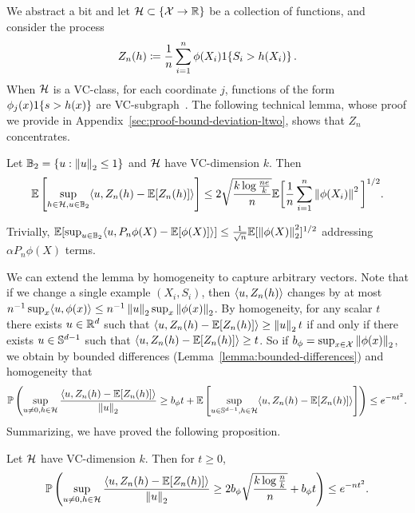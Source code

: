 \documentclass{article}
\newcommand{\radphi}{b_{\phi}}
\newcommand{\scorefunc}{s}
\newcommand{\scoreval}{\scorefunc}
\newcommand{\scorerv}{S}
\begin{document}
We abstract a bit and let $\mathcal{H} \subset \{\mathcal{X} \to \mathbb{R}\}$ be
a collection of functions, and consider the process
\begin{equation*}
  Z_n(h) \defeq \frac{1}{n}
  \sum_{i = 1}^n \phi(X_i) \indic{\scorerv_i > h(X_i)}.
\end{equation*}
%
When $\mathcal{H}$ is a VC-class, for each coordinate $j$, functions of the form
$\phi_j(x) \indic{\scoreval > h(x)}$ are VC-subgraph~\cite[Lemma
  2.6.18]{VanDerVaartWe96}.
%
The following technical lemma, whose proof we provide in
Appendix~\ref{sec:proof-bound-deviation-ltwo}, shows that $Z_n$
concentrates.
\begin{lemma}
  \label{lemma:bound-deviation-ltwo}
  Let $\mathbb{B}_2 = \{u : \left\|{u}\right\|_2 \le 1\}$
  and $\mathcal{H}$ have VC-dimension $k$.
  Then
  \begin{equation*}
    \mathbb{E}\left[\sup_{h \in \mathcal{H}, u \in \mathbb{B}_2}
      \langle u, Z_n(h) - \mathbb{E}[Z_n(h)]\rangle\right]
    \le 2 \sqrt{\frac{k \log \frac{n e}{k}}{n}}
    \mathbb{E}\bigg[\frac{1}{n} \sum_{i = 1}^n \left\|{\phi(X_i)}\right\|^2\bigg]^{1/2}.
  \end{equation*}
\end{lemma}
\noindent
Trivially, $\mathbb{E}[\sup_{u \in \mathbb{B}_2} \langle u, P_n \phi(X) -
  \mathbb{E}[\phi(X)]\rangle] \le \frac{1}{\sqrt{n}} \mathbb{E}[\left\|{\phi(X)}\right\|_2^2]^{1/2}$
addressing $\alpha P_n \phi(X)$ terms.

We can extend the lemma by homogeneity to capture arbitrary vectors.
%
Note that
if we change a single example $(X_i, \scorerv_i)$, then
$\langle u, Z_n(h)\rangle$ changes by at most
$n^{-1} \sup_x \langle u, \phi(x)\rangle \le n^{-1} \left\|{u}\right\|_2 \sup_x \left\|{\phi(x)}\right\|_2$.
%
By homogeneity, for any scalar $t$ there exists $u \in \mathbb{R}^d$ such that
$\langle u, Z_n(h) - \mathbb{E}[Z_n(h)]\rangle \ge \left\|{u}\right\|_2 t$ if and only if there exists $u
\in \mathbb{S}^{d-1}$ such that $\langle u, Z_n(h) - \mathbb{E}[Z_n(h)]\rangle \ge t$.
%
So if $\radphi = \sup_{x \in \mc{X}} \ltwo{\phi(x)}$, we obtain by bounded
differences (Lemma~\ref{lemma:bounded-differences}) and homogeneity that
\begin{equation*}
  \P\left(\sup_{u \neq 0, h \in \mc{H}}
  \frac{\<u, Z_n(h) - \E[Z_n(h)]\>}{\ltwo{u}}
  \ge \radphi t
  +
  \E\left[\sup_{u \in \sphere^{d-1}, h \in \mc{H}}
    \<u, Z_n(h) - \E[Z_n(h)]\>\right]
  \right)
  \le e^{-n t^2}.
\end{equation*}
Summarizing, we have proved the following proposition.
\begin{proposition}
  \label{proposition:high-prob-deviation}
  Let $\mathcal{H}$ have VC-dimension $k$. Then for $t \ge 0$,
  \begin{equation*}
    \P\left(\sup_{u \neq 0, h \in \mc{H}}
    \frac{\<u, Z_n(h) - \E[Z_n(h)]\>}{\ltwo{u}}
    \ge 
    2 \radphi \sqrt{\frac{k \log \frac{n}{k}}{n}} + \radphi t \right)
    \le e^{-n t^2}.
  \end{equation*}
\end{proposition}
\end{document}
